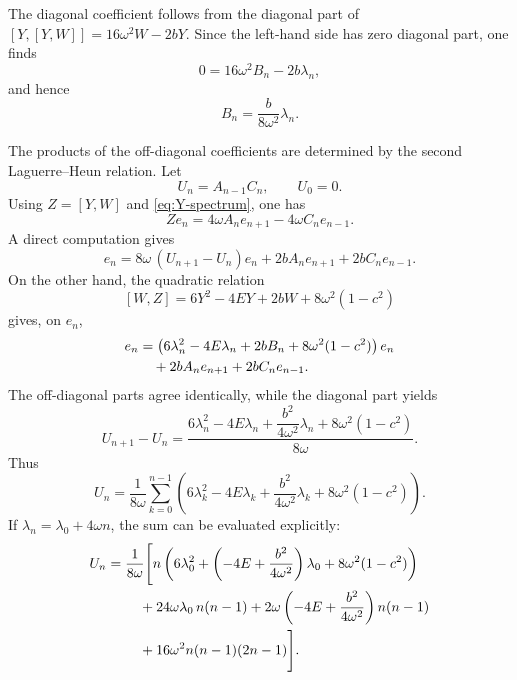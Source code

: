\documentclass[11pt]{article}
\numberwithin{equation}{section}
\theoremstyle{definition}
\theoremstyle{remark}
\begin{document}
The diagonal coefficient follows from the diagonal part of
\([Y,[Y,W]]=16\omega^2W-2bY\).  Since the left-hand side has zero diagonal
part, one finds
\[
        0=16\omega^2 B_n-2b\lambda_n,
\]
and hence
\begin{equation}
        B_n=\frac{b}{8\omega^2}\lambda_n.
        \label{eq:Bn}
\end{equation}

The products of the off-diagonal coefficients are determined by the second
Laguerre--Heun relation.  Let
\begin{equation}
        U_n=A_{n-1}C_n,\qquad U_0=0.
        \label{eq:Un-def}
\end{equation}
Using \(Z=[Y,W]\) and \eqref{eq:Y-spectrum}, one has
\begin{equation}
        Z e_n=4\omega A_n e_{n+1}-4\omega C_n e_{n-1}.
        \label{eq:Z-action}
\end{equation}
A direct computation gives
\begin{equation}
        [W,Z]e_n
        =
        8\omega\,(U_{n+1}-U_n)e_n
        +2bA_n e_{n+1}
        +2bC_n e_{n-1}.
        \label{eq:WZ-action}
\end{equation}
On the other hand, the quadratic relation
\[
        [W,Z]=6Y^2-4EY+2bW+8\omega^2(1-c^2)
\]
gives, on \(e_n\),
\begin{align}
        [W,Z]e_n
        &=
        \left(6\lambda_n^2-4E\lambda_n
        +2bB_n+8\omega^2(1-c^2)\right)e_n             \notag\\
        &\quad
        +2bA_n e_{n+1}
        +2bC_n e_{n-1}.
        \label{eq:WZ-action-2}
\end{align}
The off-diagonal parts agree identically, while the diagonal part yields
\begin{equation}
        U_{n+1}-U_n
        =
        \frac{
        6\lambda_n^2-4E\lambda_n
        +\dfrac{b^2}{4\omega^2}\lambda_n
        +8\omega^2(1-c^2)}
        {8\omega}.
        \label{eq:Un-rec}
\end{equation}
Thus
\begin{equation}
        U_n
        =
        \frac{1}{8\omega}
        \sum_{k=0}^{n-1}
        \left(
        6\lambda_k^2
        -4E\lambda_k
        +\frac{b^2}{4\omega^2}\lambda_k
        +8\omega^2(1-c^2)
        \right).
        \label{eq:Un-sum}
\end{equation}
If \(\lambda_n=\lambda_0+4\omega n\), the sum can be evaluated explicitly:
\begin{align}
U_n
={}&
\frac{1}{8\omega}
\Bigg[
n\left(6\lambda_0^2+
\left(-4E+\frac{b^2}{4\omega^2}\right)\lambda_0
+8\omega^2(1-c^2)\right)                         \notag\\
&\quad
+24\omega\lambda_0\,n(n-1)
+2\omega\left(-4E+\frac{b^2}{4\omega^2}\right)n(n-1)       \notag\\
&\quad
+16\omega^2 n(n-1)(2n-1)
\Bigg].
\label{eq:Un-explicit}
\end{align}
\end{document}
